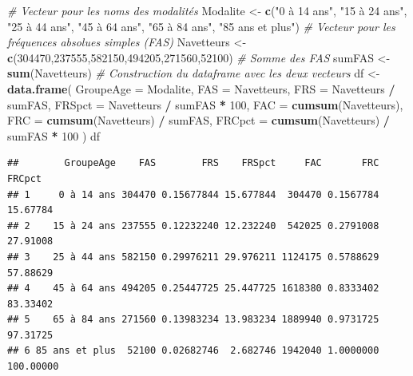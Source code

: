 \documentclass[
  11pt,
  french,
]{book}
\makeatletter
\newenvironment{Shaded}{\begin{snugshade}}{\end{snugshade}}
\newcommand{\CommentTok}[1]{\textcolor[rgb]{0.56,0.35,0.01}{\textit{#1}}}
\newcommand{\DataTypeTok}[1]{\textcolor[rgb]{0.13,0.29,0.53}{#1}}
\newcommand{\DecValTok}[1]{\textcolor[rgb]{0.00,0.00,0.81}{#1}}
\newcommand{\KeywordTok}[1]{\textcolor[rgb]{0.13,0.29,0.53}{\textbf{#1}}}
\newcommand{\NormalTok}[1]{#1}
\newcommand{\OperatorTok}[1]{\textcolor[rgb]{0.81,0.36,0.00}{\textbf{#1}}}
\newcommand{\StringTok}[1]{\textcolor[rgb]{0.31,0.60,0.02}{#1}}
\newenvironment{kframe}{%
\medskip{}
\setlength{\fboxsep}{.8em}
 \def\at@end@of@kframe{}%
 \ifinner\ifhmode%
  \def\at@end@of@kframe{\end{minipage}}%
  \begin{minipage}{\columnwidth}%
 \fi\fi%
 \def\FrameCommand##1{\hskip\@totalleftmargin \hskip-\fboxsep
 \colorbox{shadecolor}{##1}\hskip-\fboxsep
     \hskip-\linewidth \hskip-\@totalleftmargin \hskip\columnwidth}%
 \MakeFramed {\advance\hsize-\width
   \@totalleftmargin\z@ \linewidth\hsize
   \@setminipage}}%
 {\par\unskip\endMakeFramed%
 \at@end@of@kframe}
\renewenvironment{Shaded}{\begin{kframe}}{\end{kframe}}
\makeatother
\begin{document}
\begin{Shaded}
\begin{Highlighting}[]
\CommentTok{# Vecteur pour les noms des modalités}
\NormalTok{Modalite <-}\StringTok{ }\KeywordTok{c}\NormalTok{(}\StringTok{"0 à 14 ans"}\NormalTok{,}
             \StringTok{"15 à 24 ans"}\NormalTok{,}
             \StringTok{"25 à 44 ans"}\NormalTok{,}
             \StringTok{"45 à 64 ans"}\NormalTok{,}
             \StringTok{"65 à 84 ans"}\NormalTok{,}
             \StringTok{"85 ans et plus"}\NormalTok{)}
\CommentTok{# Vecteur pour les fréquences absolues simples (FAS)}
\NormalTok{Navetteurs <-}\StringTok{ }\KeywordTok{c}\NormalTok{(}\DecValTok{304470}\NormalTok{,}\DecValTok{237555}\NormalTok{,}\DecValTok{582150}\NormalTok{,}\DecValTok{494205}\NormalTok{,}\DecValTok{271560}\NormalTok{,}\DecValTok{52100}\NormalTok{)}
\CommentTok{# Somme des FAS}
\NormalTok{sumFAS <-}\StringTok{  }\KeywordTok{sum}\NormalTok{(Navetteurs)}
\CommentTok{# Construction du dataframe avec les deux vecteurs}
\NormalTok{df <-}\StringTok{ }\KeywordTok{data.frame}\NormalTok{(}
  \DataTypeTok{GroupeAge =}\NormalTok{ Modalite, }
  \DataTypeTok{FAS =}\NormalTok{ Navetteurs,}
  \DataTypeTok{FRS =}\NormalTok{ Navetteurs }\OperatorTok{/}\StringTok{ }\NormalTok{sumFAS, }
  \DataTypeTok{FRSpct =}\NormalTok{ Navetteurs }\OperatorTok{/}\StringTok{ }\NormalTok{sumFAS }\OperatorTok{*}\StringTok{ }\DecValTok{100}\NormalTok{,}
  \DataTypeTok{FAC =} \KeywordTok{cumsum}\NormalTok{(Navetteurs),}
  \DataTypeTok{FRC =} \KeywordTok{cumsum}\NormalTok{(Navetteurs) }\OperatorTok{/}\StringTok{ }\NormalTok{sumFAS,}
  \DataTypeTok{FRCpct =} \KeywordTok{cumsum}\NormalTok{(Navetteurs) }\OperatorTok{/}\StringTok{ }\NormalTok{sumFAS }\OperatorTok{*}\StringTok{ }\DecValTok{100}
\NormalTok{  )}
\NormalTok{df}
\end{Highlighting}
\end{Shaded}

\begin{verbatim}
##        GroupeAge    FAS        FRS    FRSpct     FAC       FRC    FRCpct
## 1     0 à 14 ans 304470 0.15677844 15.677844  304470 0.1567784  15.67784
## 2    15 à 24 ans 237555 0.12232240 12.232240  542025 0.2791008  27.91008
## 3    25 à 44 ans 582150 0.29976211 29.976211 1124175 0.5788629  57.88629
## 4    45 à 64 ans 494205 0.25447725 25.447725 1618380 0.8333402  83.33402
## 5    65 à 84 ans 271560 0.13983234 13.983234 1889940 0.9731725  97.31725
## 6 85 ans et plus  52100 0.02682746  2.682746 1942040 1.0000000 100.00000
\end{verbatim}
\end{document}

